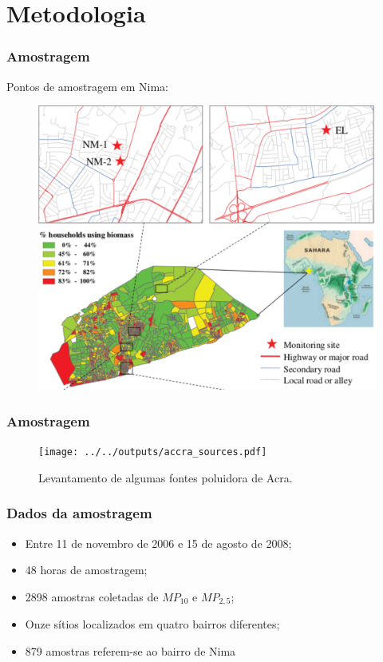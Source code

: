 \section{Metodologia}

\begin{frame}
  \frametitle{Amostragem}
 \begin{center}
  Pontos de amostragem em Nima:
 \end{center}
  \begin{figure}[H]
    \centering
    \includegraphics[scale=0.35]{../../inputs/images/zheng/nima_mapa.pdf}
  \end{figure}
\end{frame}

\begin{frame}
  \frametitle{Amostragem}
  \begin{figure}[H]
  \centering	
  \texttt{[image: ../../outputs/accra\_sources.pdf]}
  \caption{Levantamento de algumas fontes poluidora de Acra.
           \label{fg:acrasources}}
 \end{figure}
\end{frame}

\begin{frame}
  \frametitle{Dados da amostragem}
  \begin{itemize}
    \item Entre 11 de novembro de 2006 e 15 de agosto de 2008;
    \item 48 horas de amostragem;
    \item 2898 amostras coletadas de $MP_{10}$ e $MP_{2,5}$;
    \item Onze sítios localizados em quatro bairros diferentes;
    \item 879 amostras referem-se ao bairro de Nima
  \end{itemize}
\end{frame}

